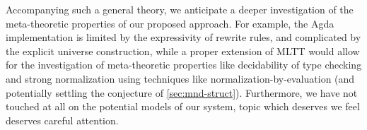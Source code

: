 Accompanying such a general theory, we anticipate a deeper
investigation of the meta-theoretic properties of our proposed
approach.  For example, the Agda implementation is limited by the
expressivity of rewrite rules, and complicated by the explicit
universe construction, while a proper extension of MLTT would allow
for the investigation of meta-theoretic properties like decidability
of type checking and strong normalization using techniques like
normalization-by-evaluation (and potentially settling the conjecture
of \ref{sec:mnd-struct}). Furthermore, we have not touched at all on
the potential models of our system, topic which deserves we feel
deserves careful attention.


